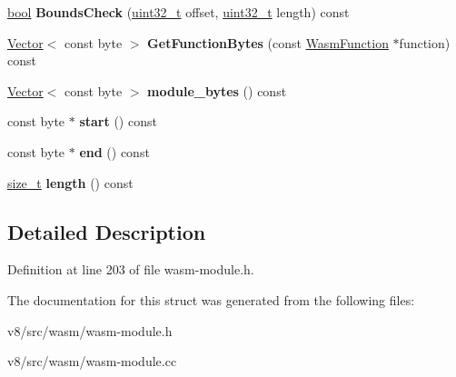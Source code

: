 \begin{DoxyCompactItemize}
\mbox{\hyperlink{classbool}{bool}} {\bfseries Bounds\+Check} (\mbox{\hyperlink{classuint32__t}{uint32\+\_\+t}} offset, \mbox{\hyperlink{classuint32__t}{uint32\+\_\+t}} length) const
\item 
\mbox{\label{structv8_1_1internal_1_1wasm_1_1ModuleWireBytes_adb447311767956fdaa4fe6a30109147d}} 
\mbox{\hyperlink{classv8_1_1internal_1_1Vector}{Vector}}$<$ const byte $>$ {\bfseries Get\+Function\+Bytes} (const \mbox{\hyperlink{structv8_1_1internal_1_1wasm_1_1WasmFunction}{Wasm\+Function}} $\ast$function) const
\item 
\mbox{\label{structv8_1_1internal_1_1wasm_1_1ModuleWireBytes_a6e1db202cb679cbda743bfbcd6c82195}} 
\mbox{\hyperlink{classv8_1_1internal_1_1Vector}{Vector}}$<$ const byte $>$ {\bfseries module\+\_\+bytes} () const
\item 
\mbox{\label{structv8_1_1internal_1_1wasm_1_1ModuleWireBytes_adc3a3fb20078be2995b5ec9d467e37de}} 
const byte $\ast$ {\bfseries start} () const
\item 
\mbox{\label{structv8_1_1internal_1_1wasm_1_1ModuleWireBytes_aaef5c8ff1990495b4f7ce7ef67142c0e}} 
const byte $\ast$ {\bfseries end} () const
\item 
\mbox{\label{structv8_1_1internal_1_1wasm_1_1ModuleWireBytes_a31e859ce9fbc3561f23d5411edd92c4b}} 
\mbox{\hyperlink{classsize__t}{size\+\_\+t}} {\bfseries length} () const
\end{DoxyCompactItemize}


\subsection{Detailed Description}


Definition at line 203 of file wasm-\/module.\+h.



The documentation for this struct was generated from the following files\+:\begin{DoxyCompactItemize}
\item 
v8/src/wasm/wasm-\/module.\+h\item 
v8/src/wasm/wasm-\/module.\+cc\end{DoxyCompactItemize}

